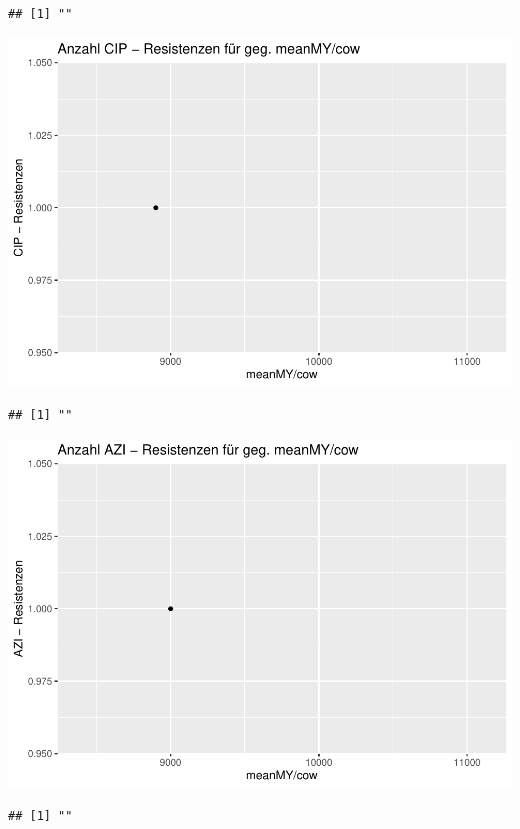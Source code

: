 \documentclass[
]{article}
\begin{document}
\begin{verbatim}
## [1] ""
\end{verbatim}

\includegraphics{NResistenzen_files/figure-latex/unnamed-chunk-6-2.pdf}

\begin{verbatim}
## [1] ""
\end{verbatim}

\includegraphics{NResistenzen_files/figure-latex/unnamed-chunk-6-3.pdf}

\begin{verbatim}
## [1] ""
\end{verbatim}
\end{document}
